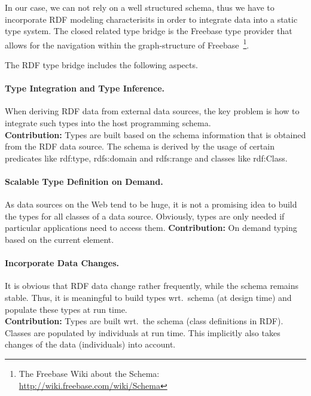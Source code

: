 \documentclass{llncs} %
\begin{document}
In our case, we can not rely on a well structured schema, thus we have to
incorporate RDF modeling characterisits in order to integrate data into
a static type system. The closed related type bridge is the Freebase  
type provider that allows for the navigation within the graph-structure of
Freebase~\footnote{The Freebase Wiki about the Schema: \url{http://wiki.freebase.com/wiki/Schema}}.

The RDF type bridge includes the following aspects.


\paragraph*{\bf Type Integration and Type Inference.}
When deriving RDF data from external data sources, the key problem is how to integrate
such types into the host programming schema. \\
\textbf{Contribution:} Types are built based on the schema information that is obtained
from the RDF data source. The schema is derived by the 
usage of certain predicates like \textsf{rdf:type}, \textsf{rdfs:domain} and \textsf{rdfs:range}
and classes like \textsf{rdf:Class}.

\paragraph{\bf Scalable Type Definition on Demand.}
As data sources on the Web tend to be huge, it is not a promising idea to
build the types for all classes of a data source.
Obviously, types are only needed if particular applications need to access them.
\textbf{Contribution:} On demand typing based on the current element. \\


\paragraph*{\bf Incorporate Data Changes.}
It is obvious that RDF data change rather frequently, while the
schema remains stable. Thus, it is meaningful to build types wrt.\ schema (at design time)
and populate these types at run time.\\
\textbf{Contribution:} Types are built wrt.\ the schema (class definitions in RDF).
Classes are populated by individuals at run time.
This implicitly also takes changes of the data (individuals) into account. \\


\end{document}
